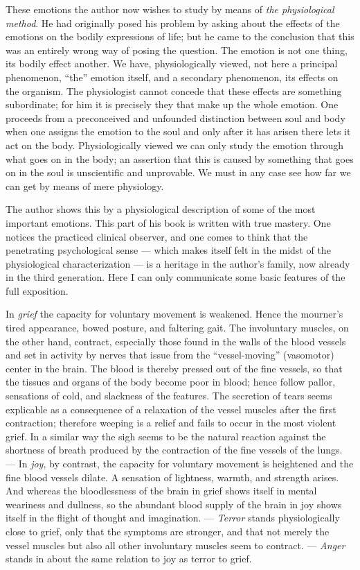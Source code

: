 \documentclass[12pt,a4paper,openany]{book}
\newcommand{\opage}[1]{\marginnote{\footnotesize\textit{[#1]}}}
\begin{document}
These emotions the author now wishes to study by means
of \emph{the physiological method}. He had originally posed his
problem by asking about the effects of the emotions
on the bodily expressions of life; but he came to the
conclusion that this was an entirely wrong way of posing the
question. The emotion is not one thing, its bodily
effect another. We have, physiologically viewed, not here a
principal phenomenon, ``the'' emotion itself, and a secondary phenomenon,
its effects on the organism. The physiologist cannot
concede that these effects are something subordinate; for
him it is precisely they that make up the whole emotion. One
proceeds from a preconceived and unfounded distinction between
soul and body when one assigns the emotion to
the soul and only after it has arisen there lets it act
on the body. Physiologically viewed we can only study the
\opage{53}emotion through what goes on in the body; an
assertion that this is caused by something that goes on in
the soul is unscientific and unprovable. We must in any
case see how far we can get by means of mere
physiology.

The author shows this by a physiological description of some
of the most important emotions. This part of his book
is written with true mastery. One notices the practiced
clinical observer, and one comes to think that the
penetrating psychological sense --- which makes itself felt in the midst of
the physiological characterization --- is a heritage in the author's
family, now already in the third generation. Here I can only
communicate some basic features of the full exposition.

In \emph{grief} the capacity for voluntary movement is weakened.
Hence the mourner's tired appearance, bowed posture, and
faltering gait. The involuntary muscles, on the other hand, contract,
especially those found in the walls of the blood vessels and
set in activity by nerves that issue from the
``vessel-moving'' (vasomotor) center in the brain. The blood
is thereby pressed out of the fine vessels, so that the tissues and
organs of the body become poor in blood; hence follow pallor,
sensations of cold, and slackness of the features. The secretion of tears
seems explicable as a consequence of a relaxation of the
vessel muscles after the first contraction; therefore weeping is
a relief and fails to occur in the most violent grief. In a similar
way the sigh seems to be the natural reaction against
the shortness of breath produced by the contraction of the fine vessels of the lungs.
--- In \emph{joy}, by contrast, the capacity for
voluntary movement is heightened and the fine blood vessels dilate. A sensation
of lightness, warmth, and strength arises. And whereas the
bloodlessness of the brain in grief shows itself in mental weariness and
dullness, so the abundant blood supply of the brain in
joy shows itself in the flight of thought and imagination. --- \emph{Terror}
stands physiologically close to grief, only that the symptoms are stronger,
and that not merely the vessel muscles but also all other
involuntary muscles seem to contract. --- \emph{Anger} stands
in about the same relation to joy as terror to grief.
\end{document}
